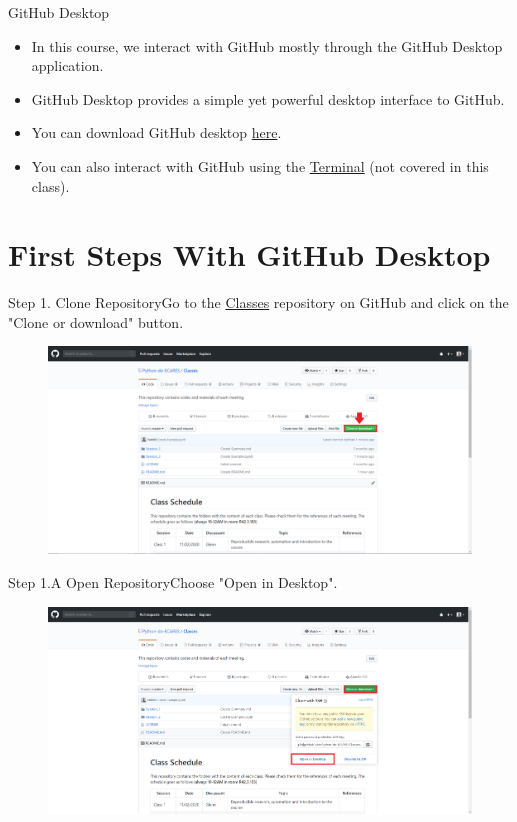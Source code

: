 \documentclass[aspectratio=169]{beamer}
\begin{document}
\begin{frame}{GitHub Desktop}

\begin{itemize}\setlength\itemsep{2em}
		\item In this course, we interact with GitHub mostly through the GitHub Desktop application.
		\item GitHub Desktop provides a simple yet powerful desktop interface to GitHub.
		\item You can download GitHub desktop \href{https://desktop.github.com/}{here}. 
		\item You can also interact with GitHub using the \href{https://github.com/codepath/ios_guides/wiki/Using-Git-with-Terminal}{Terminal} (not covered in this class).
\end{itemize}	

\end{frame}

\section{First Steps With GitHub Desktop}

\begin{frame}{Step 1. Clone Repository}{Go to the \href{https://github.com/Python-do-ECARES/Classes}{Classes} repository on GitHub and click on the "Clone or download" button.}
\begin{figure}
	\centering
	\includegraphics[width=0.9\linewidth]{../images/step1}
\end{figure}
\end{frame}

\begin{frame}{Step 1.A Open Repository}{Choose "Open in Desktop".}	
	\begin{figure}
		\centering
		\includegraphics[width=0.9\linewidth]{../images/step1.A}
	\end{figure}
\end{frame}
\end{document}
